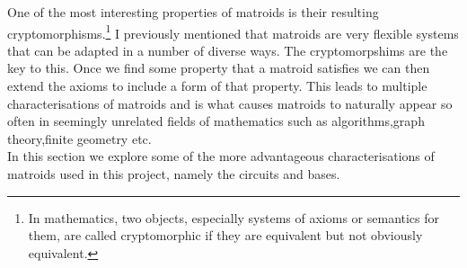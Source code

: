 \documentclass[../main.tex]{subfiles}
\begin{document}
One of the most interesting properties of matroids is their resulting cryptomorphisms.\footnote{In mathematics, two objects, especially systems of axioms or semantics for them, are called cryptomorphic if they are equivalent but not obviously equivalent.}
I previously mentioned that matroids are very flexible systems that can be adapted in a number of diverse ways. The cryptomorpshims are the key to this. Once we find some property that a matroid satisfies we can then extend the axioms to include a form of that property. This leads to multiple characterisations of matroids and is what causes matroids to naturally appear so often in seemingly unrelated fields of mathematics such as algorithms,graph theory,finite geometry etc.\\
In this section we explore some of the more advantageous characterisations of matroids used in this project, namely the circuits and bases.
\end{document}
